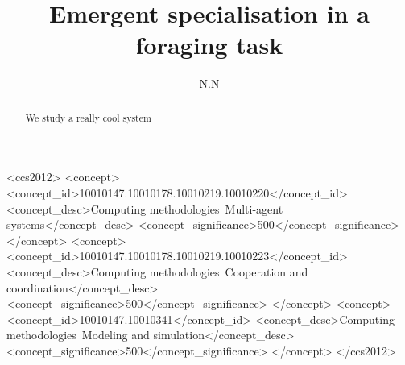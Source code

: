 \documentclass[sigconf]{aamas}  %
\begin{document}
\title{Emergent specialisation in a foraging task}  

 \author{N.N}

%



\begin{abstract}  %
We study a really cool system
\end{abstract}


\begin{CCSXML}
<ccs2012>
<concept>
<concept_id>10010147.10010178.10010219.10010220</concept_id>
<concept_desc>Computing methodologies~Multi-agent systems</concept_desc>
<concept_significance>500</concept_significance>
</concept>
<concept>
<concept_id>10010147.10010178.10010219.10010223</concept_id>
<concept_desc>Computing methodologies~Cooperation and coordination</concept_desc>
<concept_significance>500</concept_significance>
</concept>
<concept>
<concept_id>10010147.10010341</concept_id>
<concept_desc>Computing methodologies~Modeling and simulation</concept_desc>
<concept_significance>500</concept_significance>
</concept>
</ccs2012>
\end{CCSXML}




\maketitle
\end{document}
